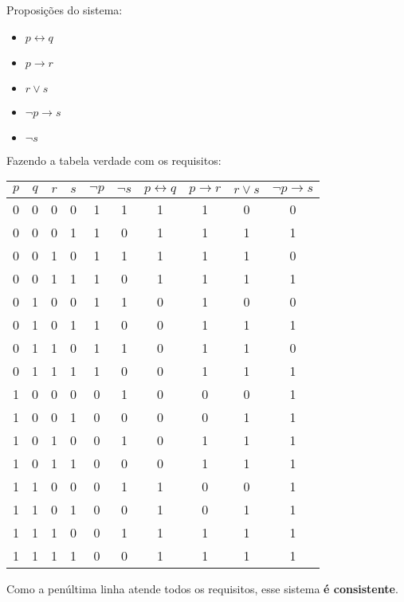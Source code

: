 \documentclass[12pt]{article}
\let\biconditional\leftrightarrow
\begin{document}
\begin{enumerate}
        Proposições do sistema:
        \begin{itemize}
            \item \( p \biconditional q\) 
            \item \( p \to r \) 
            \item \( r \lor s \) 
            \item \( \neg p \to s \) 
            \item \( \neg s \) 
        \end{itemize}

        Fazendo a tabela verdade com os requisitos:
        \begin{center}
            \begin{tabular}{|c c c c c c c c c c|} 
                \hline
                \( p \)  & \( q \) & \( r \) & \( s \) & \( \neg p \) & \( \neg s \) & \( p \biconditional q \) & \( p \to r \) & \( r \lor s \) & \( \neg p \to s \)  \\ [0.5ex]
                \hline\hline
                0 & 0 & 0 & 0 & 1 & 1 & 1 & 1 & 0 & 0\\ 
                \hline
                0 & 0 & 0 & 1 & 1 & 0 & 1 & 1 & 1 & 1\\
                \hline
                0 & 0 & 1 & 0 & 1 & 1 & 1 & 1 & 1 & 0\\
                \hline
                0 & 0 & 1 & 1 & 1 & 0 & 1 & 1 & 1 & 1\\
                \hline
                0 & 1 & 0 & 0 & 1 & 1 & 0 & 1 & 0 & 0\\ 
                \hline
                0 & 1 & 0 & 1 & 1 & 0 & 0 & 1 & 1 & 1\\
                \hline
                0 & 1 & 1 & 0 & 1 & 1 & 0 & 1 & 1 & 0\\
                \hline
                0 & 1 & 1 & 1 & 1 & 0 & 0 & 1 & 1 & 1\\
                \hline
                1 & 0 & 0 & 0 & 0 & 1 & 0 & 0 & 0 & 1\\ 
                \hline
                1 & 0 & 0 & 1 & 0 & 0 & 0 & 0 & 1 & 1\\
                \hline
                1 & 0 & 1 & 0 & 0 & 1 & 0 & 1 & 1 & 1\\
                \hline
                1 & 0 & 1 & 1 & 0 & 0 & 0 & 1 & 1 & 1\\
                \hline
                1 & 1 & 0 & 0 & 0 & 1 & 1 & 0 & 0 & 1\\ 
                \hline
                1 & 1 & 0 & 1 & 0 & 0 & 1 & 0 & 1 & 1\\
                \hline
                1 & 1 & 1 & 0 & 0 & 1 & 1 & 1 & 1 & 1\\
                \hline
                1 & 1 & 1 & 1 & 0 & 0 & 1 & 1 & 1 & 1\\ [1ex]
                \hline
            \end{tabular}
        \end{center}

        Como a penúltima linha atende todos os requisitos, esse sistema \textbf{é consistente}.
\end{enumerate}
\end{document}
